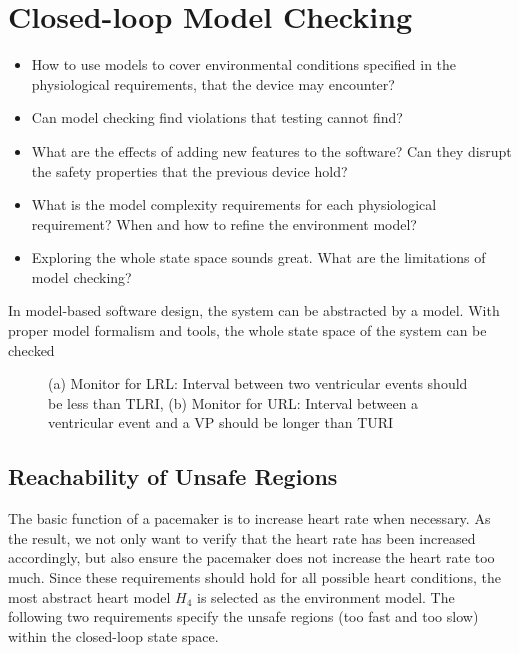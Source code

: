 \chapter{Closed-loop Model Checking}
\begin{itemize}
	\item How to use models to cover environmental conditions specified in the physiological requirements, that the device may encounter?
            \item Can model checking find violations that testing cannot find?
            \item What are the effects of adding new features to the software? Can they disrupt the safety properties that the previous device hold?
            \item What is the model complexity requirements for each physiological requirement? When and how to refine the environment model?
            \item Exploring the whole state space sounds great. What are the limitations of model checking? 
\end{itemize}
In model-based software design, the system can be abstracted by a model. With proper model formalism and tools, the whole state space of the system can be checked
\begin{figure}
\centering
	\caption{(a) Monitor for LRL: Interval between two ventricular events should be less than TLRI, (b) Monitor for URL: Interval between a ventricular event and a VP should be longer than TURI}
\end{figure} 
\section{Reachability of Unsafe Regions}
The basic function of a pacemaker is to increase heart rate when necessary. As the result, we not only want to verify that the heart rate has been increased accordingly, but also ensure the pacemaker does not increase the heart rate too much. Since these requirements should hold for all possible heart conditions, the most abstract heart model $H_4$ is selected as the environment model. The following two requirements specify the unsafe regions  (too fast and too slow) within the closed-loop state space.

